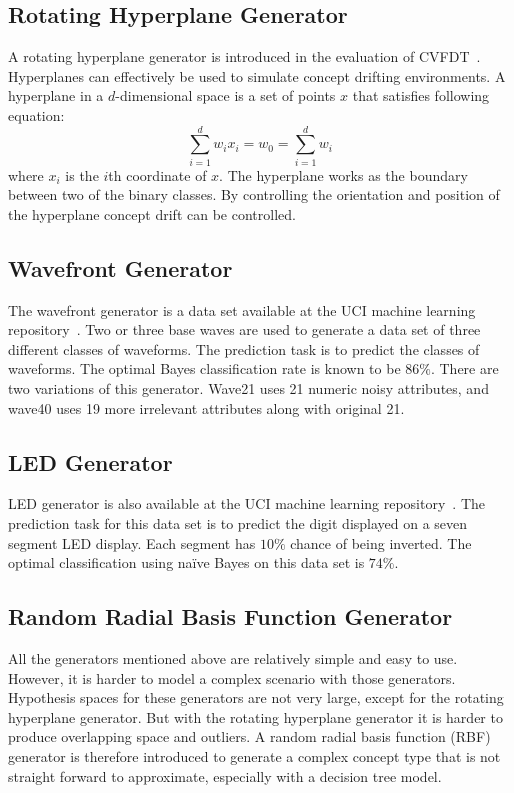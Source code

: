 \subsection*{Rotating Hyperplane Generator}
A rotating hyperplane generator is introduced in the evaluation of CVFDT~\cite{hulten01:cvfdt}. Hyperplanes can effectively be used to simulate concept drifting environments. A hyperplane in a $d$-dimensional space is a set of points $x$ that satisfies following equation:
\[
    \sum_{i=1}^{d} w_i x_i = w_0 = \sum_{i=1}^{d} w_i
\]
where $x_i$ is the $i$th coordinate of $x$. The hyperplane works as the boundary between two of the binary classes. By controlling the orientation and position of the hyperplane concept drift can be controlled. 

\subsection*{Wavefront Generator}
The wavefront generator is a data set available at the UCI machine learning repository~\cite{internet:ucirepo}. Two or three base waves are used to generate a data set of three different classes of waveforms. The prediction task is to predict the classes of waveforms. The optimal Bayes classification rate is known to be $86\%$. There are two variations of this generator. Wave21 uses 21 numeric noisy attributes, and wave40 uses 19 more irrelevant attributes along with original 21.

\subsection*{LED Generator}
LED generator is also available at the UCI machine learning repository~\cite{internet:ucirepo}. The prediction task for this data set is to predict the digit displayed on a seven segment LED display. Each segment has $10\%$ chance of being inverted. The optimal classification using na\"ive Bayes on this data set is  $74\%$. 

\subsection*{Random Radial Basis Function Generator}
All the generators mentioned above are relatively simple and easy to use. However, it is harder to model a complex scenario with those generators. Hypothesis spaces for these generators are not very large, except for the rotating hyperplane generator. But with the rotating hyperplane generator it is harder to produce overlapping space and outliers. A random radial basis function (RBF) generator is therefore introduced to generate a complex concept type that is not straight forward to approximate, especially with a decision tree model.

